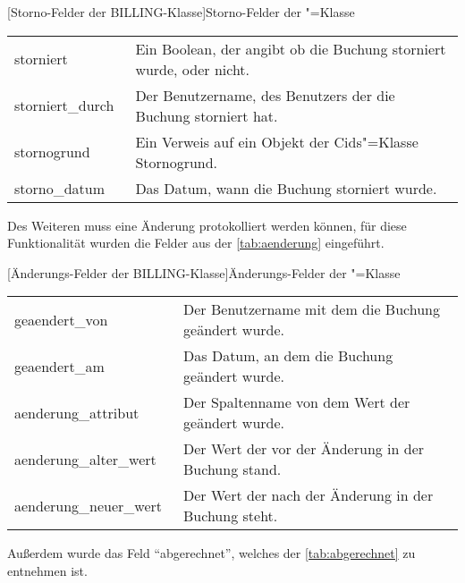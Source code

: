 \begin{minipage}{\linewidth}
[Storno-Felder der BILLING-Klasse]{Storno-Felder der "=Klasse} \label{tab:storno} 
\begin{tabulary}{\textwidth}{|L|L|}
\hline 
{} 
  &  \tabularnewline
\hline 
\mbox{storniert} & Ein Boolean, der angibt ob die Buchung storniert wurde, oder nicht. \\ 
\hline 
\mbox{storniert\_durch \hspace{8pt}} & Der Benutzername, des Benutzers der die Buchung storniert hat. \\ 
\hline
\mbox{stornogrund} &  Ein Verweis auf ein Objekt der Cids"=Klasse Stornogrund. \\ 
\hline
\mbox{storno\_datum} & Das Datum, wann die Buchung storniert wurde. \\ 
\hline
\end{tabulary}
\end{minipage}

Des Weiteren muss eine Änderung protokolliert werden können, für diese Funktionalität wurden die Felder aus der \autoref{tab:aenderung} eingeführt.

\begin{minipage}{\linewidth}
\centering
{}[Änderungs-Felder der BILLING-Klasse]{Änderungs-Felder der "=Klasse} \label{tab:aenderung} 
\begin{tabulary}{\textwidth}{|L|L|}
\hline 
{} 
  &  \tabularnewline
\hline 
\mbox{geaendert\_von} & Der Benutzername mit dem die Buchung geändert wurde. \\ 
\hline 
\mbox{geaendert\_am} & Das Datum, an dem die Buchung geändert wurde. \\
\hline
\mbox{aenderung\_attribut} &  Der Spaltenname von dem Wert der geändert wurde. \\ 
\hline
\mbox{aenderung\_alter\_wert} & Der Wert der vor der Änderung in der Buchung stand. \\ 
\hline
\mbox{aenderung\_neuer\_wert \hspace{8pt}} & Der Wert der nach der Änderung in der Buchung steht. \\ 
\hline
\end{tabulary}
\end{minipage}

Außerdem wurde das Feld "`abgerechnet"', welches der \autoref{tab:abgerechnet} zu entnehmen ist.

